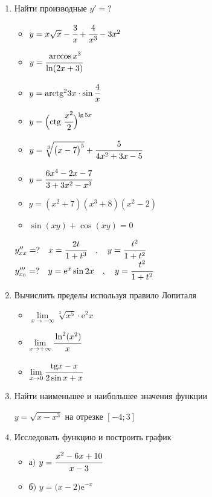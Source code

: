 \documentclass{article}
\begin{document}
\begin{multicols}{2}
\begin{enumerate}[label=\arabic*.]
	\item Найти производные $y'=?$
	\begin{multicols}{2}
		\begin{itemize}[label=""]
			\item $y=x\sqrt{x}-\cfrac{3}{x}+\cfrac{4}{x^3}-3x^2$
			\item $y=\cfrac{\arccos x^3}{\ln (2x+3)}$
			\item $y=\mbox{arctg}^23x \cdot \sin \cfrac{4}{x}$
			\item $y=\Big(\mbox{ctg}\ \cfrac{x^2}{2}\Big)^{\lg 5x}$
		\end{itemize}
		\vfill\null\columnbreak
		\begin{itemize}[label=""]
			\item $y=\sqrt[3]{\big(x-7\big)^5} + \cfrac{5}{4x^2+3x-5}$
			\item $y=\cfrac{6x^4 - 2x -7}{3+3x^2-x^3}$
			\item $y=(x^2 + 7)(x^3 + 8)(x^2 - 2)$
			\item $\sin(xy) + \cos(xy) = 0$
		\end{itemize}
	\end{multicols}
	\vspace{-3mm}
	$y''_{xx}=? \quad x=\cfrac{2t}{1+t^3} \quad,\quad y=\cfrac{t^2}{1 + t^2}$ \\
	$y'''_{x_0}=? \quad y=\mbox{e}^x \sin 2x \quad,\quad y=\cfrac{t^2}{1 + t^2}$
	\item Вычислить пределы используя правило Лопиталя
	\begin{multicols}{3}
		\raggedcolumns
		\begin{itemize}[label=""]
			\item $\lim\limits_{x\to-\infty} \sqrt[3]{x^5}\cdot\mbox{e}^2x$
			\vfill\null\columnbreak
			\item $\lim\limits_{x\to+\infty}\cfrac{\ln^2(x^2)}{x}$
			\vfill\null\columnbreak
			\item $\lim\limits_{x\to 0}\cfrac{\mbox{tg}x - x}{2\sin x + x}$
			\vfill\null\columnbreak
		\end{itemize}
	\end{multicols}
	\vspace{-4mm}	
	\item Найти наименьшее и наибольшее значения функции

	$y=\sqrt{x-x^3}$ на отрезке $[-4;3]$
	\item Исследовать функцию и построить график
	\begin{multicols}{2}
		\begin{itemize}[label=""]
			\setlength\itemsep{0.5em}
			\item а$)$ $y=\cfrac{x^2-6x+10}{x-3}$
		\end{itemize}
		\vfill\null\columnbreak
		\begin{itemize}[label=""]
			\setlength\itemsep{0.5em}
			\item б$)$ $y=\big(x-2\big)\mbox{e}^{-x}$
		\end{itemize}
	\end{multicols}
\end{enumerate}	
\end{multicols}
 
\end{document}
